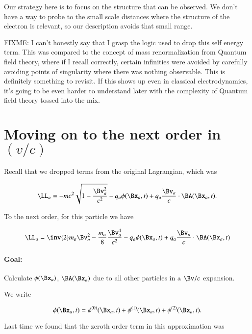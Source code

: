 Our strategy here is to focus on the structure that can be observed.  We don't have a way to probe to the small scale distances where the structure of the electron is relevant, so our description avoids that small range.

FIXME: I can't honestly say that I grasp the logic used to drop this self energy term.  This was compared to the concept of mass renormalization from Quantum field theory, where if I recall correctly, certain infinities were avoided by carefully avoiding points of singularity where there was nothing observable.  This is definitely something to revisit.  If this shows up even in classical electrodynamics, it's going to be even harder to understand later with the complexity of Quantum field theory tossed into the mix.

\section{Moving on to the next order in $(v/c)$}

Recall that we dropped terms from the original Lagrangian, which was

\begin{equation}\label{eqn:relativisticElectrodynamicsL25:90}
\LL_a = - m c^2 \sqrt{ 1 - \frac{\Bv_a^2}{c^2}} - q_a \phi(\Bx_a, t) + q_a \frac{\Bv_a}{c} \cdot \BA(\Bx_a, t).
\end{equation}

To the next order, for this particle we have

\begin{equation}\label{eqn:relativisticElectrodynamicsL25:110}
\LL_a = \inv{2} m_a \Bv_a^2 - \frac{m_a}{8} \frac{\Bv_a^4}{c^2} - q_a \phi(\Bx_a, t) + q_a \frac{\Bv_a}{c} \cdot \BA(\Bx_a, t)
\end{equation}

\paragraph{Goal:} Calculate $\phi(\Bx_a)$, $\BA(\Bx_a)$ due to all other particles in a $\Bv/c$ expansion.

We write

\begin{equation}\label{eqn:relativisticElectrodynamicsL25:130}
\phi(\Bx_a, t) = 
\phi^{(0)}(\Bx_a, t)
+\phi^{(1)}(\Bx_a, t)
+\phi^{(2)}(\Bx_a, t).
\end{equation}

Last time we found that the zeroth order term in this approximation was

